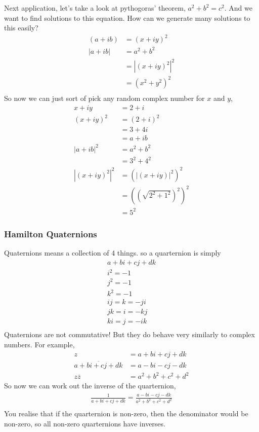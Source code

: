 \documentclass{article}
\begin{document}
Next application, let's take a look at pythogoras' theorem, $a^2+b^2=c^2$. And we want to find solutions
to this equation. How can we generate many solutions to this easily?
\begin{align*}
	(a+ib) & = (x+iy)^2     \\
	|a+ib| & = a^2 +b^2     \\
	       & = |(x+iy)^2|^2 \\
	       & = (x^2+y^2)^2  \\
\end{align*}
So now we can just sort of pick any random complex number for $x$ and $y$,
\begin{align*}
	x + iy       & = 2+i                    \\
	(x+iy)^2     & = (2+i)^2                \\
	             & = 3+4i                   \\
	             & = a+ib                   \\
	|a+ib|^2     & = a^2+b^2                \\
	             & = 3^2+4^2                \\
	|(x+iy)^2|^2 & = (|(x+iy)|^2)^2         \\
	             & = ((\sqrt{2^2+1^2})^2)^2 \\
	             & = 5^2
\end{align*}
\subsubsection{Hamilton Quaternions}
Quaternions means a collection of 4 things. so a quarternion is simply
\begin{gather*}
	a + bi + cj + dk \\
	i^2 = -1\\
	j^2 =-1 \\
	k^2 = -1 \\
	ij = k = -ji \\
	jk = i = -kj \\
	ki = j = -ik \\
\end{gather*}
Quaternions are not commutative! But they do behave very similarly to complex numbers. For example,
\begin{align*}
	z                           & = a + bi + cj + dk      \\
	\overline{a + bi + cj + dk} & = a-bi-cj-dk            \\
	z\overline{z}               & = a^2 + b^2 + c^2 + d^2
\end{align*}
So now we can work out the inverse of the quarternion,
\begin{gather*}
	\frac{1}{a+bi+cj+dk} = \frac{a-bi-cj-dk}{a^2+b^2+c^2+d^2} \\
\end{gather*}
You realise that if the quarternion is non-zero, then the denominator would be non-zero, so all
non-zero quarternions have inverses.
\end{document}
